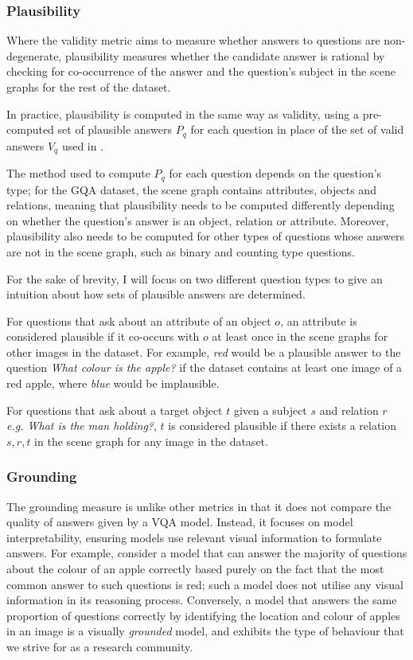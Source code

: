 \subsubsection{Plausibility}

Where the validity metric aims to measure whether answers to questions are non-degenerate, plausibility measures whether the candidate answer is rational by checking for co-occurrence of the answer and the question's subject in the scene graphs for the rest of the dataset.

In practice, plausibility is computed in the same way as validity, using a pre-computed set of plausible answers \(P_q\)  for each question in place of the set of valid answers \(V_q\) used in \equationautorefname{ \ref{equation:validity}}.

The method used to compute \(P_q\) for each question depends on the question's type; for the GQA dataset, the scene graph contains attributes, objects and relations, meaning that plausibility needs to be computed differently depending on whether the question's answer is an object, relation or attribute. Moreover, plausibility also needs to be computed for other types of questions whose answers are not in the scene graph, such as binary and counting type questions.

For the sake of brevity, I will focus on two different question types to give an intuition about how sets of plausible answers are determined.

For questions that ask about an attribute of an object \(o\), an attribute is considered plausible if it co-occurs with \(o\) at least once in the scene graphs for other images in the dataset. For example, \textit{red} would be a plausible answer to the question \textit{What colour is the apple?} if the dataset contains at least one image of a red apple, where \textit{blue} would be implausible.

For questions that ask about a target object \(t\) given a subject \(s\) and relation \(r\) \textit{e.g. What is the man holding?}, \(t\) is considered plausible if there exists a relation \(s, r, t\) in the scene graph for any image in the dataset. 

\subsubsection{Grounding}

The grounding measure is unlike other metrics in that it does not compare the quality of answers given by a VQA model. Instead, it focuses on model interpretability, ensuring models use relevant visual information to formulate answers. For example, consider a model that can answer the majority of questions about the colour of an apple correctly based purely on the fact that the most common answer to such questions is red; such a model does not utilise any visual information in its reasoning process. Conversely, a model that answers the same proportion of questions correctly by identifying the location and colour of apples in an image is a visually \textit{grounded} model, and exhibits the type of behaviour that we strive for as a research community.

